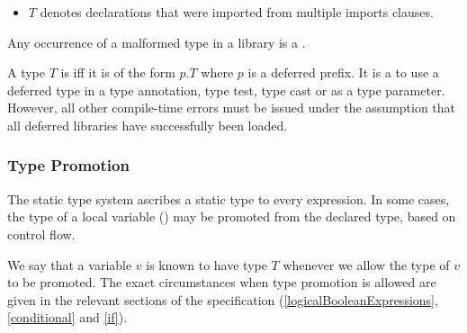 \documentclass[makeidx]{article}
\begin{document}
{\begin{itemize}

  \noindent
  or of the form



  \noindent
  where each $x_j$ which is not a named parameter may be omitted,
  and $T_j$ is malformed for some $j \in 0 .. n$,
  or $B_j$ is malformed for some $j \in 1 .. m$.
\item
  $T$ denotes declarations that were imported from multiple imports clauses.
\end{itemize}

\LMHash{}%
Any occurrence of a
malformed type in a library is a .

\LMHash{}%
A type $T$ is 
if{}f it is of the form $p.T$ where $p$ is a deferred prefix.
It is a  to use a deferred type
in a type annotation, type test, type cast or as a type parameter.
However, all other compile-time errors must be issued
under the assumption that all deferred libraries have successfully been loaded.



\subsubsection{Type Promotion}

\LMHash{}%
The static type system ascribes a static type to every expression.
In some cases, the type of a local variable
()
may be promoted from the declared type, based on control flow.

\LMHash{}%
We say that a variable $v$ is known to have type $T$
whenever we allow the type of $v$ to be promoted.
The exact circumstances when type promotion is allowed are given in
the relevant sections of the specification
(\ref{logicalBooleanExpressions}, \ref{conditional} and \ref{if}).

}
\end{document}

